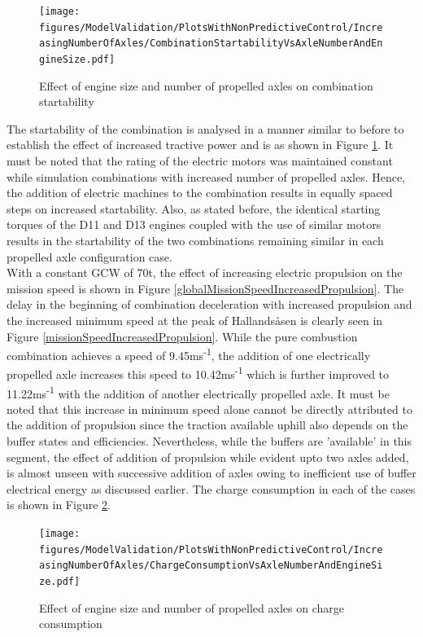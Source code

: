 \documentclass[ExampleMasters.tex]{subfiles}
\begin{document}
	\begin{figure}
	\centering
	\texttt{[image: figures/ModelValidation/PlotsWithNonPredictiveControl/IncreasingNumberOfAxles/CombinationStartabilityVsAxleNumberAndEngineSize.pdf]}
	\caption{Effect of engine size and number of propelled axles on combination startability}
	\label{startabilityEngineNumberOfAxles}
	\end{figure}
	The startability of the combination is analysed in a manner similar to before to establish the effect of increased tractive power and is as shown in Figure \ref{startabilityEngineNumberOfAxles}. It must be noted that the rating of the electric motors was maintained constant while simulation combinations with increased number of propelled axles. Hence, the addition of electric machines to the combination results in equally spaced steps on increased startability. Also, as stated before, the identical starting torques of the D11 and D13 engines coupled with the use of similar motors results in the startability of the two combinations remaining similar in each propelled axle configuration case.\\
	With a constant GCW of 70t, the effect of increasing electric propulsion on the mission speed is shown in Figure \ref{globalMissionSpeedIncreasedPropulsion}. The delay in the beginning of combination deceleration with increased propulsion and the increased minimum speed at the peak of Hallands\aa sen is clearly seen in Figure \ref{missionSpeedIncreasedPropulsion}. While the pure combustion combination achieves a speed of 9.45ms\textsuperscript{-1}, the addition of one electrically propelled axle increases this speed to 10.42ms\textsuperscript{-1} which is further improved to 11.22ms\textsuperscript{-1} with the addition of another electrically propelled axle. It must be noted that this increase in minimum speed alone cannot be directly attributed to the addition of propulsion since the traction available uphill also depends on the buffer states and efficiencies. Nevertheless, while the buffers are 'available' in this segment, the effect of addition of propulsion while evident upto two axles added, is almost unseen with successive addition of axles owing to inefficient use of buffer electrical energy as discussed earlier. The charge consumption in each of the cases is shown in Figure \ref{chargeEngineSizeNumberOfAxles}.
	\begin{figure}
	\centering
	\texttt{[image: figures/ModelValidation/PlotsWithNonPredictiveControl/IncreasingNumberOfAxles/ChargeConsumptionVsAxleNumberAndEngineSize.pdf]}
	\caption{Effect of engine size and number of propelled axles on charge consumption}
	\label{chargeEngineSizeNumberOfAxles}
	\end{figure}
\end{document}
